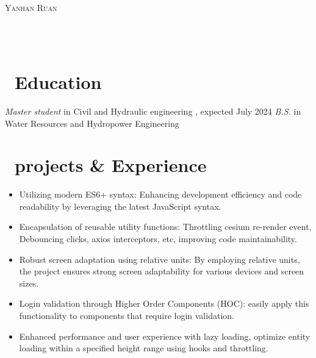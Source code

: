 \documentclass{resume}
\begin{document}

\begin{center}
\begin{minipage}[t]{0.4\textwidth}
    \vspace{0pt} %
    \raggedright
    \scshape\Large Yanhan Ruan \\
     \\
\end{minipage}%
\begin{minipage}[t]{0.6\textwidth}
    \vspace{0pt} %
    \raggedleft
     \\
\end{minipage}
\end{center}

\section{\faGraduationCap\ Education}
\textit{Master student} in Civil and Hydraulic engineering , expected July 2024
\textit{B.S.} in Water Resources and Hydropower Engineering

\section{\faUsers\ projects \& Experience}
\begin{itemize}
  \item Utilizing modern ES6+ syntax: Enhancing development efficiency and code readability by leveraging the latest JavaScript syntax.
  \item Encapsulation of reusable utility functions: Throttling cesium re-render event, Debouncing clicks, axios interceptors, etc, improving code maintainability.
  \item Robust screen adaptation using relative units: By employing relative units, the project ensures strong screen adaptability for various devices and screen sizes.
  \item Login validation through Higher Order Components (HOC): easily apply this functionality to components that require login validation.
  \item Enhanced performance and user experience with lazy loading, optimize entity loading within a specified height range using hooks and throttling.
\end{itemize}
\end{document}
